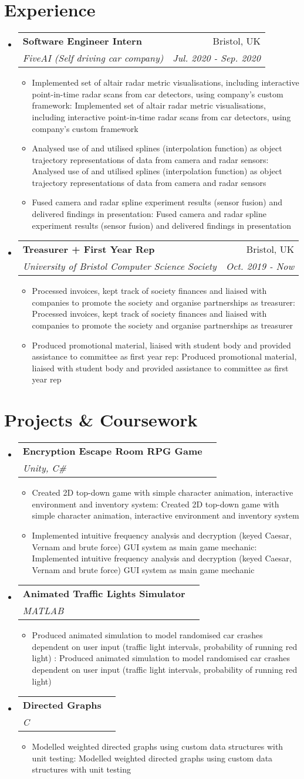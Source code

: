 \documentclass[a4paper,11pt]{article}
\makeatletter
\def \ifempty#1{\def\temp{#1} \ifx\temp\empty }
\newcommand{\resumeItem}[2]{
  \item\small{
  	\ifempty{#1}#2\else\textbf{#1}{: #2 \vspace{-2pt}}\fi
  }
}
\newcommand{\resumeSubheading}[4]{
  \vspace{-1pt}\item
    \begin{tabular*}{0.97\textwidth}{l@{\extracolsep{\fill}}r}
      \textbf{#1} & #2 \\
      \textit{\small#3} & \textit{\small #4} \\
    \end{tabular*}\vspace{-5pt}
}
\newcommand{\resumeSubHeadingListStart}{\begin{itemize}[leftmargin=*]}
\newcommand{\resumeSubHeadingListEnd}{\end{itemize}}
\newcommand{\resumeItemListStart}{\begin{itemize}}
\newcommand{\resumeItemListEnd}{\end{itemize}\vspace{-5pt}}
\makeatother
\begin{document}
\section{Experience}
  \resumeSubHeadingListStart
    \resumeSubheading
      {Software Engineer Intern}{Bristol, UK}
      {FiveAI (Self driving car company)}{Jul. 2020 - Sep. 2020}
      \resumeItemListStart
      	\resumeItem{}
          {Implemented set of altair radar metric visualisations, including interactive point-in-time radar scans from car detectors, using company's custom framework}
      	\resumeItem{}
          {Analysed use of and utilised splines (interpolation function) as object trajectory representations of data from camera and radar sensors}
        \resumeItem{}
          {Fused camera and radar spline experiment results (sensor fusion) and delivered findings in presentation}
        \resumeItemListEnd

    \resumeSubheading
      {Treasurer + First Year Rep}{Bristol, UK}
      {University of Bristol Computer Science Society}{Oct. 2019 - Now}
      \resumeItemListStart
      	\resumeItem{}
          {Processed invoices, kept track of society finances and liaised with companies to promote the society and organise partnerships as treasurer}
        \resumeItem{}
          {Produced promotional material, liaised with student body and provided assistance to committee as first year rep}
      \resumeItemListEnd

  \resumeSubHeadingListEnd


\section{Projects \& Coursework}
  \resumeSubHeadingListStart
    \resumeSubheading
      {Encryption Escape Room RPG Game}{}
      {Unity, C\#}{}
      \resumeItemListStart
        \resumeItem{}
          {Created 2D top-down game with simple character animation, interactive environment and inventory system}
        \resumeItem{}
          {Implemented intuitive frequency analysis and decryption (keyed Caesar, Vernam and brute force) GUI system as main game mechanic}
      \resumeItemListEnd
    \resumeSubheading
      {Animated Traffic Lights Simulator}{}
      {MATLAB}{}
      \resumeItemListStart
        \resumeItem{}
          {Produced animated simulation to model randomised car crashes dependent on user input (traffic light intervals, probability of running red light) }
      \resumeItemListEnd
    \resumeSubheading
      {Directed Graphs}{}
      {C}{}
      \resumeItemListStart
        \resumeItem{}
          {Modelled weighted directed graphs using custom data structures with unit testing}
      \resumeItemListEnd
  \resumeSubHeadingListEnd
\end{document}
